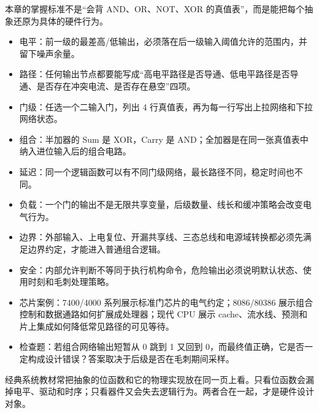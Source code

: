\begin{classicnote}
本章的掌握标准不是“会背 AND、OR、NOT、XOR 的真值表”，而是能把每个抽象还原为具体的硬件行为。

\begin{itemize}
\item 电平：前一级的最差高/低输出，必须落在后一级输入阈值允许的范围内，并留下噪声余量。
\item 路径：任何输出节点都要能写成“高电平路径是否导通、低电平路径是否导通、是否存在冲突电流、是否存在悬空”四项。
\item 门级：任选一个二输入门，列出 4 行真值表，再为每一行写出上拉网络和下拉网络状态。
\item 组合：半加器的 Sum 是 XOR，Carry 是 AND；全加器是在同一张真值表中纳入进位输入后的组合电路。
\item 延迟：同一个逻辑函数可以有不同门级网络，最长路径不同，稳定时间也不同。
\item 负载：一个门的输出不是无限共享变量，后级数量、线长和缓冲策略会改变电气行为。
\item 边界：外部输入、上电复位、开漏共享线、三态总线和电源域转换都必须先满足边界约定，才能进入普通组合逻辑。
\item 安全：内部允许判断不等同于执行机构命令，危险输出必须说明默认状态、使用时刻和毛刺处理策略。
\item 芯片案例：7400/4000 系列展示标准门芯片的电气约定；8086/80386 展示组合控制和数据通路如何扩展成处理器；现代 CPU 展示 cache、流水线、预测和片上集成如何降低常见路径的可见等待。
\item 检查题：若组合网络输出短暂从 0 跳到 1 又回到 0，而最终值正确，它是否一定构成设计错误？答案取决于后级是否在毛刺期间采样。
\end{itemize}

经典系统教材常把抽象的位函数和它的物理实现放在同一页上看。只看位函数会漏掉电平、驱动和时序；只看器件又会失去逻辑行为。两者合在一起，才是硬件设计对象。
\end{classicnote}
